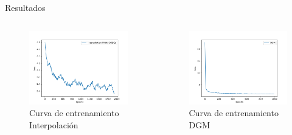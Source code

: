 \documentclass[aspectratio=169,xcolor=dvipsnames]{beamer}
\begin{document}
\begin{frame}{Resultados}
		    \begin{columns}[c] %
		
		\begin{figure}
			\centering
			\includegraphics[width=\linewidth]{images/Interp_training.png}
			\caption{Curva de entrenamiento Interpolación}
		\end{figure}
		
		\vspace*{4mm}
		\begin{figure}
			\centering
			\includegraphics[width=\linewidth]{images/trainingDGM.png}
			\caption{Curva de entrenamiento DGM}
		\end{figure}
	\end{columns}
\end{frame}
\end{document}
